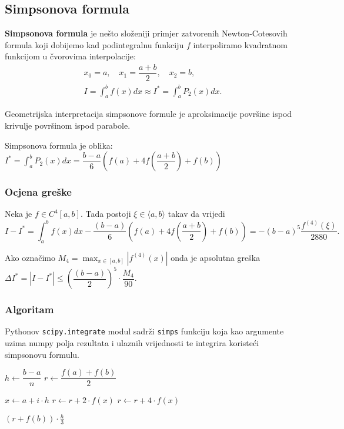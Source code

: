 \subsection{Simpsonova formula}

\textbf{Simpsonova formula} je nešto složeniji primjer zatvorenih Newton-Cotesovih
formula koji dobijemo kad podintegralnu funkciju $f$ interpoliramo kvadratnom
funkcijom u čvorovima interpolacije:
\begin{gather*}
    x_0 = a,\quad x_1=\dfrac{a+b}{2},\quad x_2 = b,\\
    I = \int_a^b f(x)dx \approx I^* = \int_a^b P_2(x)dx.
\end{gather*}

Geometrijska interpretacija simpsonove formule je aproksimacije površine ispod krivulje površinom ispod parabole.

Simpsonova formula je oblika: $\displaystyle
I^* = \int_a^b P_2(x)dx = \dfrac{b-a}{6}\left(f(a) + 4f\left(\dfrac{a+b}{2}\right) + f(b)\right)
$

\subsubsection{Ocjena greške}

Neka je $f\in C^4[a,b]$. Tada postoji $\xi \in \langle a,b\rangle$ takav da vrijedi
$$
I - I^* = \int_a^b f(x) dx - \dfrac{(b-a)}{6}\left(f(a) + 4f\left(\dfrac{a+b}{2}\right) + f(b)\right) = -(b-a)^5\dfrac{f^{(4)}(\xi)}{2880}.
$$

Ako označimo $\displaystyle M_4 = \max_{x\in[a,b]}|f^{(4)}(x)|$ onda je apsolutna
greška $\displaystyle \Delta I^* = |I - I^*| \leq \left(\dfrac{(b-a)}{2}\right)^5 \cdot \dfrac{M_4}{90}.$


\subsubsection{Algoritam}

Pythonov \verb|scipy.integrate| modul sadrži \verb|simps| funkciju koja kao
argumente uzima numpy polja rezultata i ulaznih vrijednosti te integrira
koristeći simpsonovu formulu.

\begin{algorithmic}
    \State $h \gets \dfrac{b - a}{n}$
    \State $r \gets \dfrac{f(a) + f(b)}{2}$

        \State $x \gets a + i \cdot h$
            \State $r \gets r + 2 \cdot f(x)$
        \Else
            \State $r \gets r + 4 \cdot f(x)$
        \EndIf
    \EndFor

    \State \Return $(r + f(b)) \cdot \frac{h}{3}$
\EndFunction
\end{algorithmic}

